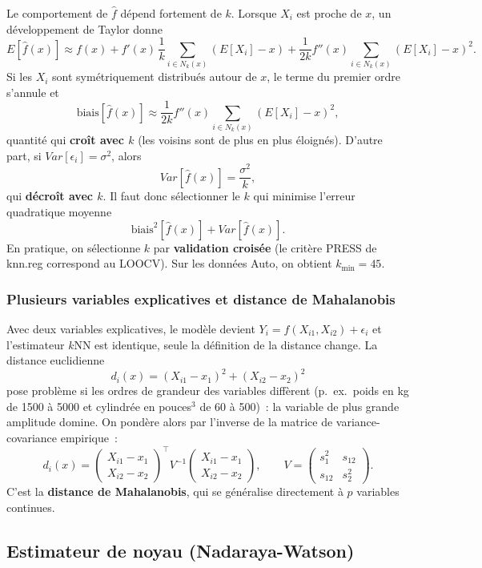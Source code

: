 \documentclass[11pt,letterpaper]{article}
\begin{document}
Le comportement de $\hat f$ dépend fortement de $k$. Lorsque $X_i$ est proche de $x$, un développement de Taylor donne
$$E[\hat f(x)] \approx f(x) + f'(x)\,\frac{1}{k}\sum_{i\in N_k(x)}(E[X_i] - x) + \frac{1}{2k}f''(x)\sum_{i\in N_k(x)}(E[X_i] - x)^2.$$
Si les $X_i$ sont symétriquement distribués autour de $x$, le terme du premier ordre s'annule et
$$\mbox{biais}[\hat f(x)] \approx \frac{1}{2k}f''(x)\sum_{i\in N_k(x)}(E[X_i] - x)^2,$$
quantité qui \textbf{croît avec $k$} (les voisins sont de plus en plus éloignés). D'autre part, si $Var[\epsilon_i] = \sigma^2$, alors
$$Var[\hat f(x)] = \frac{\sigma^2}{k},$$
qui \textbf{décroît avec $k$}. Il faut donc sélectionner le $k$ qui minimise l'erreur quadratique moyenne
$$\mbox{biais}^2[\hat f(x)] + Var[\hat f(x)].$$
En pratique, on sélectionne $k$ par \textbf{validation croisée} (le critère \textsf{PRESS} de \textsf{knn.reg} correspond au LOOCV). Sur les données \textsf{Auto}, on obtient $k_{\min} = 45$.

\subsubsection{Plusieurs variables explicatives et distance de Mahalanobis}

Avec deux variables explicatives, le modèle devient $Y_i = f(X_{i1}, X_{i2}) + \epsilon_i$ et l'estimateur $k$NN est identique, seule la définition de la distance change. La distance euclidienne
$$d_i(x) = (X_{i1} - x_1)^2 + (X_{i2} - x_2)^2$$
pose problème si les ordres de grandeur des variables diffèrent (p.~ex.\ poids en kg de 1500 à 5000 et cylindrée en pouces$^3$ de 60 à 500)~: la variable de plus grande amplitude domine. On pondère alors par l'inverse de la matrice de variance-covariance empirique~:
$$d_i(x) = \begin{pmatrix} X_{i1}-x_1 \\ X_{i2}-x_2\end{pmatrix}^{\!\top} V^{-1}\begin{pmatrix} X_{i1}-x_1 \\ X_{i2}-x_2\end{pmatrix},
\qquad V = \begin{pmatrix} s_1^2 & s_{12} \\ s_{12} & s_2^2\end{pmatrix}.$$
C'est la \textbf{distance de Mahalanobis}, qui se généralise directement à $p$ variables continues.

\subsection{Estimateur de noyau (Nadaraya-Watson)}
\end{document}
